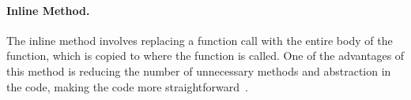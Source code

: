 \paragraph{Inline Method.}

The inline method involves replacing a function call with the entire body of 
the function, which is copied to where the function is called. One of the 
advantages of this method is reducing the number of unnecessary methods and 
abstraction in the code, making the code more straightforward~\citep{refactorbook}.

